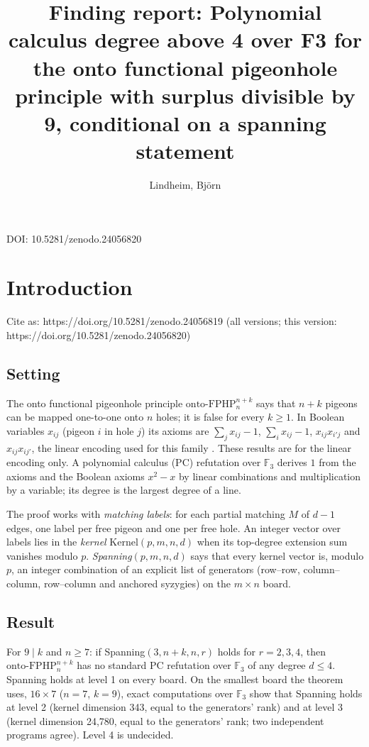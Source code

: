 \documentclass{article}
\title{Finding report: Polynomial calculus degree above 4 over F3 for the onto functional pigeonhole principle with surplus divisible by 9, conditional on a spanning statement}
\author{Lindheim, Björn}
\date{}
\begin{document}
\maketitle
\begin{center}DOI: 10.5281/zenodo.24056820\end{center}
\section{Introduction}
\label{sec:conditional-pc-degree-four-onto-fphp-surplus-9}

Cite as: https://doi.org/10.5281/zenodo.24056819 (all versions; this version: https://doi.org/10.5281/zenodo.24056820)

\subsection*{Setting}

The onto functional pigeonhole principle $\mathrm{onto\text{-}FPHP}^{n+k}_n$ says that $n+k$
pigeons can be mapped one-to-one onto $n$ holes; it is false for every $k\ge1$. In Boolean
variables $x_{ij}$ (pigeon $i$ in hole $j$) its axioms are $\sum_j x_{ij}-1$,
$\sum_i x_{ij}-1$, $x_{ij}x_{i'j}$ and $x_{ij}x_{ij'}$, the linear encoding used for this family
\cite{beame1998counting,razborov2001php}. These results are for the linear encoding only. A polynomial
calculus (PC) refutation over $\mathbb F_3$ derives $1$ from the axioms and the Boolean axioms
$x^2-x$ by linear combinations and multiplication by a variable; its degree is the largest degree of
a line.

The proof works with \emph{matching labels}: for each partial matching $M$ of $d-1$ edges, one label per
free pigeon and one per free hole. An integer vector over labels lies in the \emph{kernel} $\mathrm{Kernel}(p,m,n,d)$
when its top-degree extension sum vanishes modulo $p$. \emph{Spanning}$(p,m,n,d)$ says that every kernel vector
is, modulo $p$, an integer combination of an explicit list of generators (row--row, column--column,
row--column and anchored syzygies) on the $m\times n$ board.

\subsection*{Result}

For $9\mid k$ and $n\ge7$: if Spanning$(3,n+k,n,r)$ holds for $r=2,3,4$, then
$\mathrm{onto\text{-}FPHP}^{n+k}_n$ has no standard PC refutation over $\mathbb F_3$ of any degree
$d\le4$. Spanning holds at level 1 on every board. On the smallest board the theorem uses,
$16\times7$ ($n=7$, $k=9$), exact computations over $\mathbb F_3$ show that Spanning holds at level 2
(kernel dimension 343, equal to the generators' rank) and at level 3 (kernel dimension 24,780, equal to
the generators' rank; two independent programs agree). Level 4 is undecided.
\end{document}
